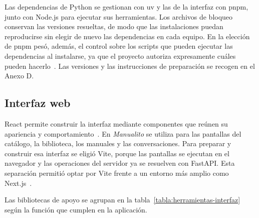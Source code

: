 Las dependencias de Python se gestionan con uv y las de la interfaz con
pnpm, junto con Node.js para ejecutar sus herramientas. Los archivos de
bloqueo conservan las versiones resueltas, de modo que las instalaciones
puedan reproducirse sin elegir de nuevo las dependencias en cada equipo.
En la elección de pnpm pesó, además, el control sobre los scripts que
pueden ejecutar las dependencias al instalarse, ya que el proyecto
autoriza expresamente cuáles pueden hacerlo~\cite{pnpm_scripts}.
Las versiones y las instrucciones de preparación se recogen en el Anexo D.

\subsection{Interfaz web}

React permite construir la interfaz mediante componentes que reúnen su
apariencia y comportamiento~\cite{react_inicio}. En \textit{Manualito} se
utiliza para las pantallas del catálogo, la biblioteca, los manuales y las
conversaciones. Para preparar y construir esa interfaz se eligió Vite,
porque las pantallas se ejecutan en el navegador y las operaciones del
servidor ya se resuelven con FastAPI. Esta separación permitió optar por
Vite frente a un entorno más amplio como
Next.js~\cite{vite_inicio,nextjs_documentacion}.

Las bibliotecas de apoyo se agrupan en la tabla~\ref{tabla:herramientas-interfaz}
según la función que cumplen en la aplicación.

